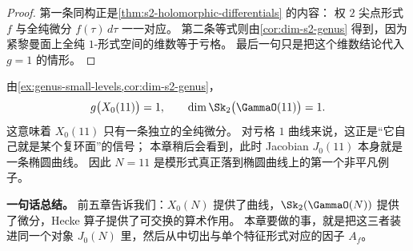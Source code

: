 \begin{proof}
第一条同构正是\cref{thm:s2-holomorphic-differentials} 的内容：
权 $2$ 尖点形式 $f$ 与全纯微分 $f(\tau)\,d\tau$ 一一对应。
第二条等式则由\cref{cor:dim-s2-genus} 得到，因为紧黎曼面上全纯 $1$-形式空间的维数等于亏格。
最后一句只是把这个维数结论代入 $g=1$ 的情形。
\end{proof}

\begin{example}[为什么 $N=11$ 立即值得关注]
\label{ex:jacobian-motivation-11}
由\cref{ex:genus-small-levels,cor:dim-s2-genus}，
\[
  g\bigl(X_0(11)\bigr)=1,
  \qquad
  \dim \Sk_2\bigl(\GammaO(11)\bigr)=1.
\]
这意味着 $X_0(11)$ 只有一条独立的全纯微分。
对亏格 $1$ 曲线来说，这正是“它自己就是某个复环面”的信号；
本章稍后会看到，此时 Jacobian $J_0(11)$ 本身就是一条椭圆曲线。
因此 $N=11$ 是模形式真正落到椭圆曲线上的第一个非平凡例子。
\end{example}

\textbf{一句话总结。}
前五章告诉我们：$X_0(N)$ 提供了曲线，$\Sk_2(\GammaO(N))$ 提供了微分，Hecke 算子提供了可交换的算术作用。
本章要做的事，就是把这三者装进同一个对象 $J_0(N)$ 里，然后从中切出与单个特征形式对应的因子 $A_f$。
